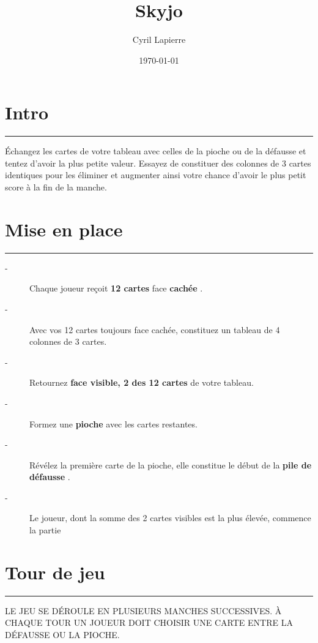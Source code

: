 \documentclass{article}%
\title{Skyjo}%
\author{Cyril Lapierre}%
\date{\today}%
\begin{document}
%
\normalsize%
\maketitle\thispagestyle{header}%
\pagestyle{header}%
\sectionfont{\color{blue}}%
\subsectionfont{\color{blue}}%
\subsubsectionfont{\color{blue}}%
\section{ Intro
}%
\label{sec:Intro}%
\textcolor{blue}{\rule{18cm}{0.07cm}}\break%
Échangez les cartes de votre tableau avec celles de la pioche ou de la défausse et tentez d'avoir la plus petite valeur. Essayez de constituer des colonnes de 3 cartes identiques pour les éliminer et augmenter ainsi votre chance d'avoir le plus petit score à la fin de la manche.


%
\sectionfont{\color{mygreen}}%
\subsectionfont{\color{mygreen}}%
\subsubsectionfont{\color{mygreen}}%
\section{ Mise en place
}%
\label{sec:Miseenplace}%
\textcolor{mygreen}{\rule{18cm}{0.07cm}}\break%
\begin{description}%
\item[{-} ]%
%
 Chaque joueur reçoit %
\textcolor{mygreen}{%
\textbf{12 cartes}%
}%
\textit{ }%
 face %
\textcolor{mygreen}{%
\textbf{cachée}%
}%
.
%
\item[{-} ]%
%
 Avec vos 12 cartes toujours face cachée, constituez un tableau de 4 colonnes de 3 cartes.
%
\item[{-} ]%
%
 Retournez %
\textcolor{mygreen}{%
\textbf{face visible, 2 des 12 cartes}%
}%
\textit{ }%
 de votre tableau.
%
\item[{-} ]%
%
 Formez une %
\textcolor{mygreen}{%
\textbf{pioche}%
}%
\textit{ }%
 avec les cartes restantes.
%
\item[{-} ]%
%
 Révélez la première carte de la pioche, elle constitue le début de la %
\textcolor{mygreen}{%
\textbf{pile de défausse}%
}%
.
%
\item[{-} ]%
%
 Le joueur, dont la somme des 2 cartes visibles est la plus élevée, commence la partie
%
\end{description}

%
\sectionfont{\color{red}}%
\subsectionfont{\color{red}}%
\subsubsectionfont{\color{red}}%
\section{ Tour de jeu
}%
\label{sec:Tourdejeu}%
\textcolor{red}{\rule{18cm}{0.07cm}}\break%
LE JEU SE DÉROULE EN PLUSIEURS MANCHES SUCCESSIVES. À CHAQUE TOUR UN JOUEUR DOIT CHOISIR UNE CARTE ENTRE LA DÉFAUSSE OU LA PIOCHE.
\end{document}
